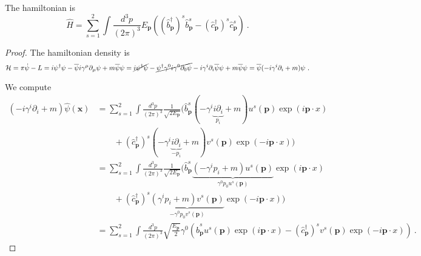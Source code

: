     The hamiltonian is 
    \begin{equation*}
        \hat H = \sum_{s=1}^{2} \int \frac{d^3 p}{(2\pi)^3} E_{\mathbf p} ((\hat b^\dagger_{\mathbf p})^s \hat b^s_{\mathbf p} - (\hat c^\dagger_{\mathbf p})^s \hat c^s_{\mathbf p}) ~.
    \end{equation*}
    \begin{proof}
        The hamiltonian density is 
        \begin{equation*}
            \mathcal H = \pi \dot \psi - L = i \psi^\dagger \psi - \overline \psi i \gamma^\mu \partial_\mu \psi + m \overline \psi \psi = \cancel{i \psi^\dagger \psi} - \cancel{\psi^\dagger \gamma^0 i \gamma^0 \partial_0 \psi} - i \gamma^i \partial_i \overline \psi \psi + m \overline \psi \psi = \overline \psi (- i \gamma^i \partial_i + m) \psi ~.
        \end{equation*}

        We compute 
        \begin{equation*}
        \begin{aligned}
            (- i \gamma^i \partial_i + m) \hat \psi (\mathbf x) & = \sum_{s=1}^{2} \int \frac{d^3 p}{(2\pi)^3} \frac{1}{\sqrt{2 E_{\mathbf p}}} (\hat b^s_{\mathbf p} (- \gamma^i \underbrace{i \partial_i}_{p_i} + m) u^s (\mathbf p) \exp(i \mathbf p \cdot x) \\ & \qquad + (\hat c^\dagger_{\mathbf p})^s (- \gamma^i \underbrace{i \partial_i}_{- p_i} + m) v^s (\mathbf p) \exp(-i \mathbf p \cdot x) ) \\ & = \sum_{s=1}^{2} \int \frac{d^3 p}{(2\pi)^3} \frac{1}{\sqrt{2 E_{\mathbf p}}} (\hat b^s_{\mathbf p} \underbrace{(- \gamma^i p_i + m) u^s (\mathbf p)}_{\gamma^0 p_0 u^s (\mathbf p)} \exp(i \mathbf p \cdot x) \\ & \qquad + (\hat c^\dagger_{\mathbf p})^s \underbrace{(\gamma^i p_i + m) v^s (\mathbf p)}_{- \gamma^0 p_0 v^s (\mathbf p)} \exp(-i \mathbf p \cdot x) ) \\ & = \sum_{s=1}^{2} \int \frac{d^3 p}{(2\pi)^3} \sqrt{\frac{E_{\mathbf p}}{2}} \gamma^0 (\hat b^s_{\mathbf p} u^s (\mathbf p) \exp(i \mathbf p \cdot x) - (\hat c^\dagger_{\mathbf p})^s v^s (\mathbf p) \exp(-i \mathbf p \cdot x) ) ~.
        \end{aligned}
        \end{equation*}


\end{proof}
